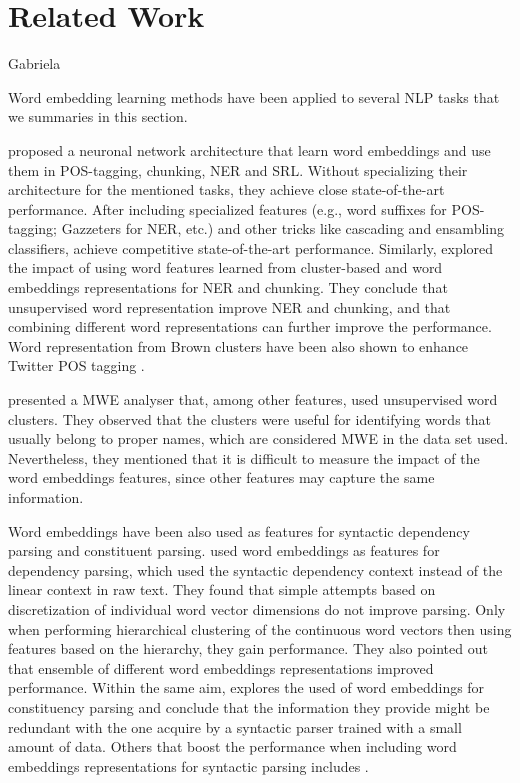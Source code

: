 
\section{Related Work}
{\color{red}Gabriela}

Word embedding learning methods have been applied to several 
NLP tasks that we summaries in this section.

 proposed a neuronal network architecture
that learn word embeddings and use them in POS-tagging, chunking, NER and SRL. 
Without specializing their architecture for the mentioned tasks, they achieve close state-of-the-art performance. After including specialized features (e.g., word suffixes for POS-tagging;  Gazzeters for NER, etc.) and other tricks like cascading and ensambling classifiers, achieve competitive state-of-the-art performance.
Similarly,  explored the impact of using word
features learned from cluster-based and word embeddings representations
for NER and chunking. 
They conclude that unsupervised word representation improve NER and chunking, and that combining different word representations can further improve the performance.
Word representation from Brown clusters have been also shown to enhance
Twitter POS tagging . 

 presented a MWE analyser that, among other features, used unsupervised word clusters. 
They observed that the clusters were useful for identifying words that usually belong to proper names, which are considered MWE in the data set used. Nevertheless, they mentioned that it is difficult to measure the impact of the word embeddings features, since other features may capture the same information. 

Word embeddings have been also used as features for syntactic dependency parsing and constituent parsing. 
 used word embeddings as features for dependency parsing, which used the syntactic dependency context instead of the linear context in raw text. They found that simple attempts based on discretization of individual word vector dimensions do not improve parsing. Only when performing hierarchical clustering of the continuous word vectors then using features based on the hierarchy, they gain performance. They also pointed out that ensemble of different word embeddings representations improved performance.
Within the same aim,  explores the used of word embeddings for constituency parsing and conclude that the
information they provide might be redundant with the one acquire by a syntactic parser trained with a small amount of data. Others that boost the performance when including word embeddings representations for syntactic parsing includes \cite{Koo:2008,Koo:2010,Haffari:2011,Tratz:2011}.

